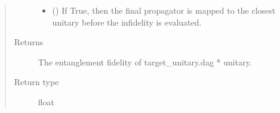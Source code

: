 \documentclass[letterpaper,10pt,english]{sphinxmanual}
\begin{document}
\begin{fulllineitems}
\begin{quote}
\begin{description}
\begin{itemize}
\item {} 
 () \textendash{} If True, then the final propagator is mapped to the closest unitary
before the infidelity is evaluated.

\end{itemize}

\item[{Returns}] \leavevmode
{} \textendash{} The entanglement fidelity of target\_unitary.dag * unitary.

\item[{Return type}] \leavevmode
float

\end{description}\end{quote}

\end{fulllineitems}

\end{document}
